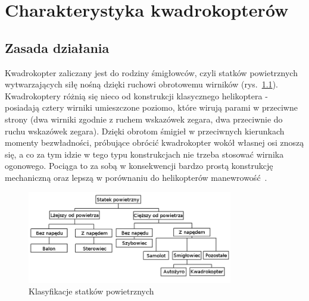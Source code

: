 
\chapter{Charakterystyka kwadrokopterów} %

\label{Chapter2} %



\section{Zasada działania}
Kwadrokopter zaliczany jest do rodziny śmigłowców, czyli statków powietrznych wytwarzających siłę nośną dzięki ruchowi obrotowemu wirników (rys.~\ref{fig:quadrotor_clasification.png}). Kwadrokoptery różnią się nieco od konstrukcji klasycznego helikoptera - posiadają cztery wirniki umieszczone poziomo, które wirują parami w przeciwne strony (dwa wirniki zgodnie z ruchem wskazówek zegara, dwa przeciwnie do ruchu wskazówek zegara). Dzięki obrotom śmigieł w przeciwnych kierunkach momenty bezwładności, próbujące obrócić kwadrokopter wokół własnej osi znoszą się, a co za tym idzie w tego typu konstrukcjach nie trzeba stosować wirnika ogonowego. Pociąga to za sobą w konsekwencji bardzo prostą konstrukcję mechaniczną oraz lepszą w porównaniu do helikopterów manewrowość~\cite{quadro1}. 

\begin{figure}[htbp]
	\centering
		\includegraphics[width=0.8\textwidth]{Pictures/quadrotor_clasification2.png}
		\caption[Klasyfikacja statków powietrznych]{Klasyfikacje statków powietrznych~\cite{quadro2, quadro3}}
		\label{fig:quadrotor_clasification.png}
\end{figure}

